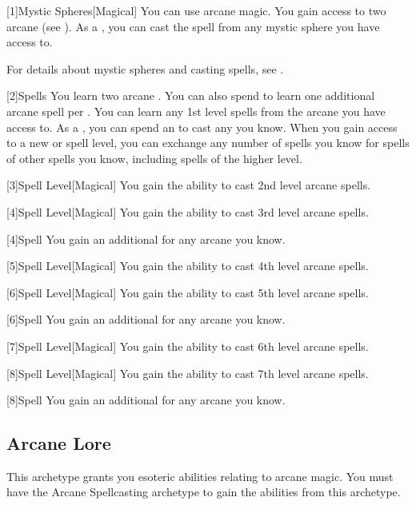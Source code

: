         [1]{Mystic Spheres}[Magical]
        You can use arcane magic.
        You gain access to two arcane  (see ).
        As a , you can cast the  spell from any mystic sphere you have access to.

        For details about mystic spheres and casting spells, see .

        [2]{Spells} You learn two arcane .
        You can also spend  to learn one additional arcane spell per .
        You can learn any 1st level spells from the arcane  you have access to.
        As a , you can spend an  to cast any  you know.
        When you gain access to a new  or spell level, you can exchange any number of spells you know for spells of other spells you know, including spells of the higher level.

        [3]{Spell Level}[Magical] You gain the ability to cast 2nd level arcane spells.

        [4]{Spell Level}[Magical] You gain the ability to cast 3rd level arcane spells.

        [4]{Spell} You gain an additional  for any arcane  you know.

        [5]{Spell Level}[Magical] You gain the ability to cast 4th level arcane spells.

        [6]{Spell Level}[Magical] You gain the ability to cast 5th level arcane spells.

        [6]{Spell} You gain an additional  for any arcane  you know.

        [7]{Spell Level}[Magical] You gain the ability to cast 6th level arcane spells.

        [8]{Spell Level}[Magical] You gain the ability to cast 7th level arcane spells.

        [8]{Spell} You gain an additional  for any arcane  you know.

    \subsection{Arcane Lore}
        This archetype grants you esoteric abilities relating to arcane magic.
        You must have the Arcane Spellcasting archetype to gain the abilities from this archetype.

